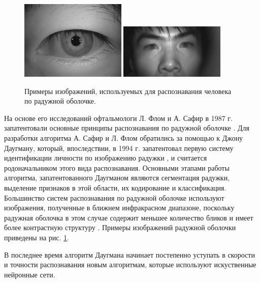 \documentclass[14pt, a4paper]{extarticle}
\begin{document}
\begin{center}
\begin{figure}[h!]
	\centering
	\includegraphics[width=0.45\textwidth]{iris_sample_1.png}
	\hspace{0.05\textwidth}
	\includegraphics[width=0.45\textwidth]{iris_sample_2.png}
	\caption{Примеры изображений, используемых для распознавания человека по радужной оболочке.}
	\label{img:iris_samples}
\end{figure}
\vspace{-1cm}
\end{center}

На основе его исследований офтальмологи Л. Флом и А. Сафир в 1987 г. запатентовали основные принципы распознавания по радужной оболочке \cite{flom1987iris}. Для разработки алгоритма А. Сафир и Л. Флом обратились за помощью к Джону Даугману, который, впоследствии, в 1994 г. запатентовал первую систему идентификации личности по изображению радужки \cite{daugman1994biometric}, и считается родоначальником этого вида распознавания. Основными этапами работы алгоритма, запатентованного Даугманом являются сегментация радужки, выделение признаков в этой области, их кодирование и классификация.
Большинство систем распознавания по радужной оболочке используют изображения, полученные в ближнем инфракрасном диапазоне, поскольку радужная оболочка в этом случае содержит меньшее количество бликов и имеет более контрастную структуру \cite{Daugman02}. Примеры изображений радужной оболочки приведены на рис. \ref{img:iris_samples}.

В последнее время алгоритм Даугмана начинает постепенно уступать в скорости и точности распознавания новым алгоритмам, которые используют искуственные нейронные сети.
\end{document}
